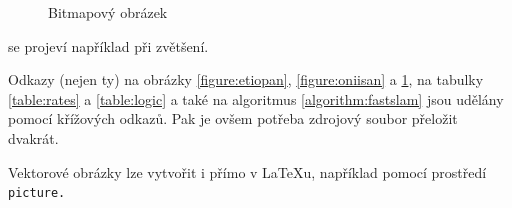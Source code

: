 \documentclass[a4paper, 11pt]{article}
\begin{document}
	\begin{figure}[h]
		\centering
		\caption{Bitmapový obrázek}
		\label{figure:oniisan2}
	\end{figure}
	\bigskip
	\noindent se projeví například při zvětšení.

	Odkazy (nejen ty) na obrázky \ref{figure:etiopan}, \ref{figure:oniisan} a \ref{figure:oniisan2}, na tabulky \ref{table:rates} a \ref{table:logic}
	a také na algoritmus \ref{algorithm:fastslam} jsou udělány pomocí křížových odkazů. Pak je ovšem potřeba zdrojový soubor přeložit dvakrát.

	Vektorové obrázky lze vytvořit i přímo v {\LaTeX}u, například pomocí prostředí\texttt{ picture.}

    \newpage
\end{document}
